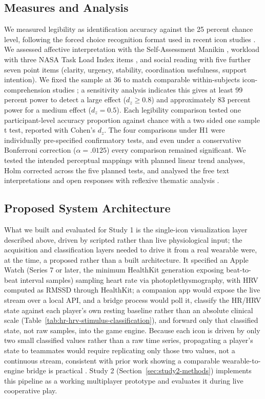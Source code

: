\documentclass[manuscript,review,anonymous]{acmart}
\begin{document}
\subsection{Measures and Analysis}
We measured legibility as identification accuracy against the 25 percent chance level, following the forced choice recognition format used in recent icon studies \cite{schafer_shape_2023}. We assessed affective interpretation with the Self-Assessment Manikin \cite{bradley_measuring_1994}, workload with three NASA Task Load Index items \cite{hart_development_1988}, and social reading with five further seven point items (clarity, urgency, stability, coordination usefulness, support intention). We fixed the sample at 36 to match comparable within-subjects icon-comprehension studies \cite{schafer_shape_2023}; a sensitivity analysis indicates this gives at least 99 percent power to detect a large effect ($d_z \geq 0.8$) and approximately 83 percent power for a medium effect ($d_z = 0.5$). Each legibility comparison tested one participant-level accuracy proportion against chance with a two sided one sample t test, reported with Cohen's $d_z$. The four comparisons under H1 were individually pre-specified confirmatory tests, and even under a conservative Bonferroni correction ($\alpha=.0125$) every comparison remained significant. We tested the intended perceptual mappings with planned linear trend analyses, Holm corrected across the five planned tests, and analysed the free text interpretations and open responses with reflexive thematic analysis \cite{braun_using_2006, bowman_thematic_2023}.

\subsection{Proposed System Architecture}
What we built and evaluated for Study 1 is the single-icon visualization layer described above, driven by scripted rather than live physiological input; the acquisition and classification layers needed to drive it from a real wearable were, at the time, a proposed rather than a built architecture. It specified an Apple Watch (Series 7 or later, the minimum HealthKit generation exposing beat-to-beat interval samples) sampling heart rate via photoplethysmography, with HRV computed as RMSSD through HealthKit; a companion app would expose the live stream over a local API, and a bridge process would poll it, classify the HR/HRV state against each player's own resting baseline rather than an absolute clinical scale (Table~\ref{tab:hr-hrv-stimulus-classification}), and forward only that classified state, not raw samples, into the game engine. Because each icon is driven by only two small classified values rather than a raw time series, propagating a player's state to teammates would require replicating only those two values, not a continuous stream, consistent with prior work showing a comparable wearable-to-engine bridge is practical \cite{liang_harnessing_2024}. Study 2 (Section~\ref{sec:study2-methods}) implements this pipeline as a working multiplayer prototype and evaluates it during live cooperative play.
\end{document}
